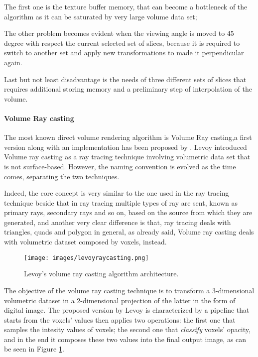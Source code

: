 \documentclass[12pt,a4paper]{extarticle}
\newcommand{\linespace}{\vspace{8pt}}
\begin{document}
The first one is the texture buffer memory, that can become a bottleneck of the algorithm as it can be saturated by very large volume data set; 

The other problem becomes evident when the viewing angle is moved to 45 degree with respect the current selected set of slices, because it is required to switch to another set and apply new transformations to made it perpendicular again.


Last but not least disadvantage is the needs of three different sets of slices that requires additional storing memory and a preliminary step of interpolation of the volume.

\paragraph{Volume Ray casting}
The most known direct volume rendering algorithm is Volume Ray casting,a first version along with an implementation has been proposed by \cite{levoy_1990:5}.
Levoy introduced Volume ray casting as a ray tracing technique involving volumetric data set that is not surface-based. However, the naming convention is evolved as the time comes, separating the two techniques.
\linespace

Indeed, the core concept is very similar to the one used in the ray tracing technique beside that in ray tracing multiple types of ray are sent, known as primary rays, secondary rays and so on, based on the source from which they are generated, and another very clear difference is that, ray tracing deals with triangles, quads and polygon in general, as already said, Volume ray casting deals with volumetric dataset composed by voxels, instead.


\begin{figure}[hbtp]
\centering
\texttt{[image: images/levoyraycasting.png]}
\caption{Levoy's volume ray casting algorithm architecture.}
\label{fig:levoyraycasting}
\end{figure}

The objective of the volume ray casting technique is to transform a 3-dimensional volumetric dataset in a 2-dimensional projection of the latter in the form of digital image. The proposed version by Levoy is characterized by a pipeline that starts from the voxels' values then applies two operations: the first one that samples the intesity values of voxels; the second one that \textit{classify} voxels' opacity, and in the end it composes these two values into the final output image, as can be seen in Figure \ref{fig:levoyraycasting}.
\linespace
\end{document}
